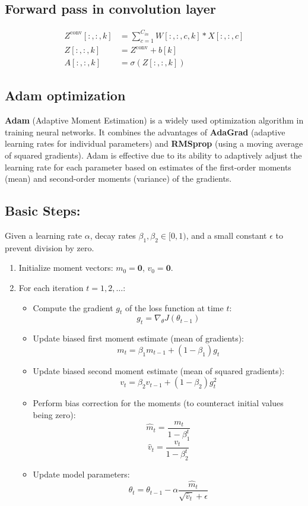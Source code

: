 \subsection{Forward pass in convolution layer}
\begin{align*}
Z^{\text{conv}}[:,:,k] &= \sum_{c=1}^{C_{in}} W[:,:,c,k] * X[:,:,c] \\
Z[:,:,k] &= Z^{\text{conv}} + b[k] \\
A[:,:,k] &= \sigma(Z[:,:,k])
\end{align*}

\subsection{Adam optimization}
\textbf{Adam} (Adaptive Moment Estimation) is a widely used optimization algorithm in training neural networks. It combines the advantages of \textbf{AdaGrad} (adaptive learning rates for individual parameters) and \textbf{RMSprop} (using a moving average of squared gradients). Adam is effective due to its ability to adaptively adjust the learning rate for each parameter based on estimates of the first-order moments (mean) and second-order moments (variance) of the gradients.

\subsection*{Basic Steps:}
Given a learning rate $\alpha$, decay rates $\beta_1, \beta_2 \in [0, 1)$, and a small constant $\epsilon$ to prevent division by zero.
\begin{enumerate}
    \item Initialize moment vectors: $m_0 = \mathbf{0}$, $v_0 = \mathbf{0}$.
    \item For each iteration $t = 1, 2, \dots$:
    \begin{itemize}
        \item Compute the gradient $g_t$ of the loss function at time $t$:
        $$g_t = \nabla_\theta J(\theta_{t-1})$$
        \item Update biased first moment estimate (mean of gradients):
        $$m_t = \beta_1 m_{t-1} + (1 - \beta_1) g_t$$
        \item Update biased second moment estimate (mean of squared gradients):
        $$v_t = \beta_2 v_{t-1} + (1 - \beta_2) g_t^2$$
        \item Perform bias correction for the moments (to counteract initial values being zero):
        $$\hat{m}_t = \frac{m_t}{1 - \beta_1^t}$$
        $$\hat{v}_t = \frac{v_t}{1 - \beta_2^t}$$
        \item Update model parameters:
        $$\theta_t = \theta_{t-1} - \alpha \frac{\hat{m}_t}{\sqrt{\hat{v}_t} + \epsilon}$$
    \end{itemize}
\end{enumerate}

